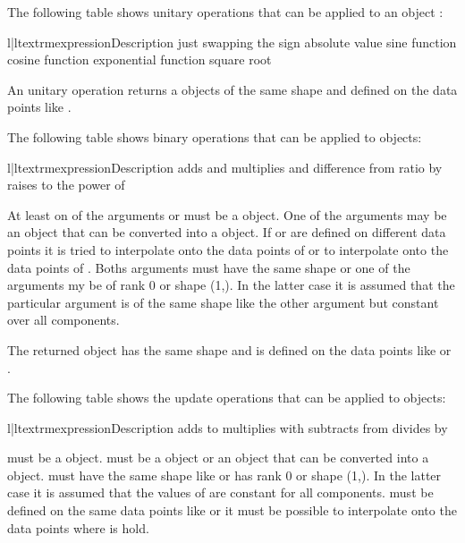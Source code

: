 The following table shows unitary operations that can be applied to an
\Data object :
\begin{tableii}{l|l}{textrm}{expression}{Description}
 {just  \index{+}}
 {swapping the sign\index{-}}
 {absolute value}
 {sine function}
 {cosine function}
 {exponential function}
 {square root}
\end{tableii}
An unitary operation returns a \Data objects of the same shape
and defined on the data points like .

The following table shows binary operations that can be applied to
\Data objects:
\begin{tableii}{l|l}{textrm}{expression}{Description}
 {adds  and  \index{+}}
 {multiplies  and  \index{*}}
 {difference  from \index{-}}
 {ratio  by  \index{/}}
 {raises  to the power of  \index{**}}
\end{tableii}
At least on of the arguments  or  must be a
\Data object. One of the arguments may be an object that can be
converted into a \Data object. If  or  are
defined on different data points it is tried to interpolate 
onto the data points of  or to interpolate  onto
the data points of . Boths arguments must have the same
shape or one of the arguments my be of rank 0 or shape (1,). In the
latter case it is assumed that the particular argument is of the same
shape like the other argument but constant over all components.

The returned \Data object has the same shape and is defined on
the data points like  or .

The following table shows the update operations that can be applied to
\Data objects:
\begin{tableii}{l|l}{textrm}{expression}{Description}
 {adds  to  \index{+}}
 {multiplies  with  \index{*}}
 {subtracts  from \index{-}}
 {divides  by  \index{/}}
\end{tableii}
 must be a \Data object.  must be a
\Data object or an object that can be converted into a
\Data object.  must have the same shape like
 or has rank 0 or shape (1,).  In the latter case it is
assumed that the values of  are constant for all
components.  must be defined on the same data points like
 or it must be possible to interpolate  onto the
data points where  is hold.



